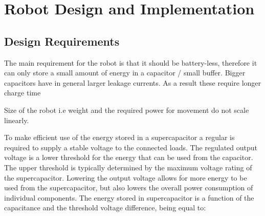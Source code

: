 \chapter{Robot Design and Implementation}


\section{Design Requirements}
\label{sec:design_requirements}





The main requirement for the robot is  that it should be battery-less, therefore it can only store a small amount of energy in a capacitor / small buffer.
Bigger capacitors have in general larger leakage currents.
As a result these require longer charge time

Size of the robot i.e weight and the required power for movement do not scale linearly.

To make efficient use of the energy stored in a supercapacitor a regular is required to supply a stable voltage to the connected loads.
The regulated output voltage is a lower threshold for the energy that can be used from the capacitor.
The upper threshold is typically determined by the maximum voltage rating of the supercapacitor.
Lowering the output voltage allows for more energy to be used from the supercapacitor, but also lowers the overall power consumption of individual components.
The energy stored in supercapacitor is a function of the capacitance and the threshold voltage difference, being equal to:

